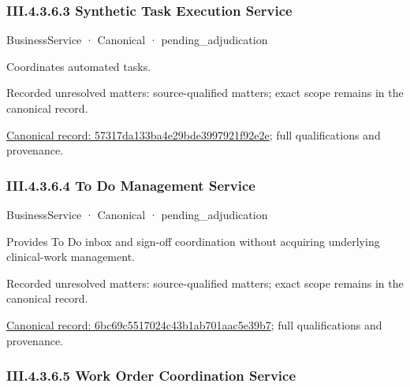 \subsubsection*{III.4.3.6.3 Synthetic Task Execution Service}
\label{navigation:III.4.3.6.3}

\label{element:57317da133ba4e29bde3997921f92e2e}
{\small BusinessService · Canonical · pending\_adjudication}\par

Coordinates automated tasks.


{\small Recorded unresolved matters: source-qualified matters; exact scope remains in the canonical record.}\par
{\footnotesize \href{../../../../../../../../continuum/business/business-service/57317da133ba4e29bde3997921f92e2e.md}{Canonical record: 57317da133ba4e29bde3997921f92e2e}; full qualifications and provenance.}\par
\subsubsection*{III.4.3.6.4 To Do Management Service}
\label{navigation:III.4.3.6.4}

\label{element:6bc69c5517024c43b1ab701aac5e39b7}
{\small BusinessService · Canonical · pending\_adjudication}\par

Provides To Do inbox and sign-off coordination without acquiring underlying clinical-work management.


{\small Recorded unresolved matters: source-qualified matters; exact scope remains in the canonical record.}\par
{\footnotesize \href{../../../../../../../../continuum/business/business-service/6bc69c5517024c43b1ab701aac5e39b7.md}{Canonical record: 6bc69c5517024c43b1ab701aac5e39b7}; full qualifications and provenance.}\par
\subsubsection*{III.4.3.6.5 Work Order Coordination Service}
\label{navigation:III.4.3.6.5}

